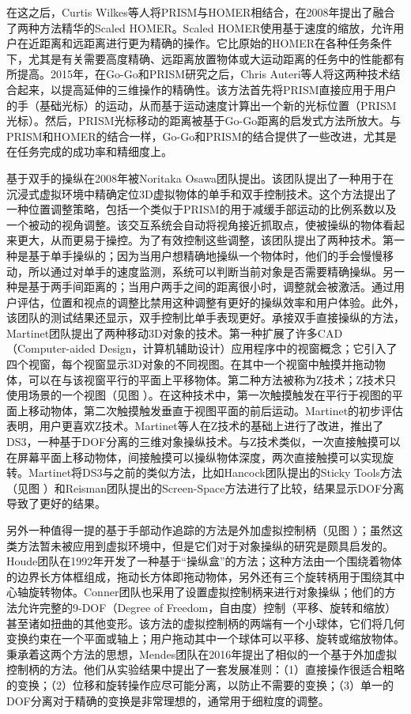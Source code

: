 在这之后，Curtis Wilkes等人将PRISM与HOMER相结合，在2008年提出了融合了两种方法精华的Scaled HOMER\cite{2008Curtis}。Scaled HOMER使用基于速度的缩放，允许用户在近距离和远距离进行更为精确的操作。它比原始的HOMER在各种任务条件下，尤其是有关需要高度精确、远距离放置物体或大运动距离的任务中的性能都有所提高。2015年，在Go-Go和PRISM研究之后，Chris Auteri等人将这两种技术结合起来，以提高延伸的三维操作的精确性。该方法首先将PRISM直接应用于用户的手（基础光标）的运动，从而基于运动速度计算出一个新的光标位置（PRISM光标）。然后，PRISM光标移动的距离被基于Go-Go距离的启发式方法所放大。与 PRISM和HOMER的结合一样，Go-Go和PRISM的结合提供了一些改进，尤其是在任务完成的成功率和精细度上。

基于双手的操纵在2008年被Noritaka Osawa团队提出。该团队提出了一种用于在沉浸式虚拟环境中精确定位3D虚拟物体的单手和双手控制技术。这个方法提出了一种位置调整策略，包括一个类似于PRISM的用于减缓手部运动的比例系数以及一个被动的视角调整。该交互系统会自动将视角接近抓取点，使被操纵的物体看起来更大，从而更易于操控。为了有效控制这些调整，该团队提出了两种技术。第一种是基于单手操纵的；因为当用户想精确地操纵一个物体时，他们的手会慢慢移动，所以通过对单手的速度监测，系统可以判断当前对象是否需要精确操纵。另一种是基于两手间距离的；当用户两手之间的距离很小时，调整就会被激活。通过用户评估，位置和视点的调整比禁用这种调整有更好的操纵效率和用户体验。此外，该团队的测试结果还显示，双手控制比单手表现更好。承接双手直接操纵的方法，Martinet团队提出了两种移动3D对象的技术。第一种扩展了许多CAD（Computer-aided Design，计算机辅助设计）应用程序中的视窗概念；它引入了四个视窗，每个视窗显示3D对象的不同视图。在其中一个视窗中触摸并拖动物体，可以在与该视窗平行的平面上平移物体。第二种方法被称为Z技术；Z技术只使用场景的一个视图（见图 ）。在这种技术中，第一次触摸触发在平行于视图的平面上移动物体，第二次触摸触发垂直于视图平面的前后运动。Martinet的初步评估表明，用户更喜欢Z技术。Martinet等人在Z技术的基础上进行了改进，推出了DS3，一种基于DOF分离的三维对象操纵技术。与Z技术类似，一次直接触摸可以在屏幕平面上移动物体，间接触摸可以操纵物体深度，两次直接触摸可以实现旋转。Martinet将DS3与之前的类似方法，比如Hancock团队提出的Sticky Tools方法（见图 ）和Reisman团队提出的Screen-Space方法进行了比较，结果显示DOF分离导致了更好的结果。

另外一种值得一提的基于手部动作追踪的方法是外加虚拟控制柄（见图 ）；虽然这类方法暂未被应用到虚拟环境中，但是它们对于对象操纵的研究是颇具启发的。Houde团队在1992年开发了一种基于“操纵盒”的方法；这种方法由一个围绕着物体的边界长方体框组成，拖动长方体即拖动物体，另外还有三个旋转柄用于围绕其中心轴旋转物体。Conner团队也采用了设置虚拟控制柄来进行对象操纵；他们的方法允许完整的9-DOF（Degree of Freedom，自由度）控制（平移、旋转和缩放）甚至诸如扭曲的其他变形。该方法的虚拟控制柄的两端有一个小球体，它们将几何变换约束在一个平面或轴上；用户拖动其中一个球体可以平移、旋转或缩放物体。秉承着这两个方法的思想，Mendes团队在2016年提出了相似的一个基于外加虚拟控制柄的方法。他们从实验结果中提出了一套发展准则：（1）直接操作很适合粗略的变换；（2）位移和旋转操作应尽可能分离，以防止不需要的变换；（3）单一的DOF分离对于精确的变换是非常理想的，通常用于细粒度的调整。

